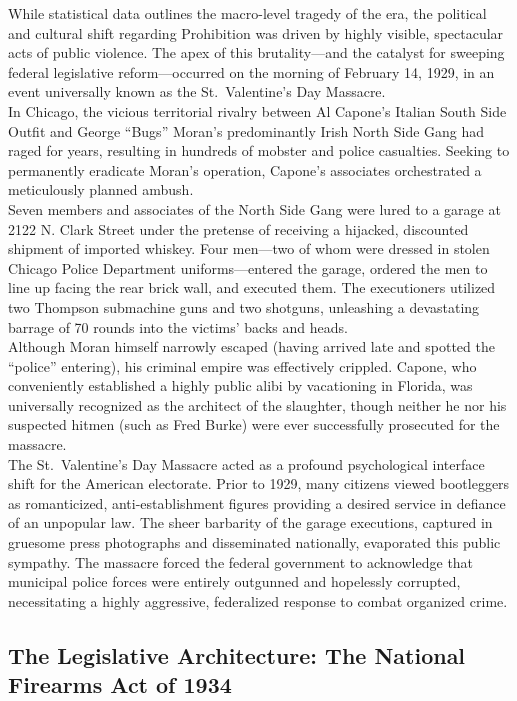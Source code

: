 \documentclass[
]{article}
\begin{document}
While statistical data outlines the macro-level tragedy of the era, the
political and cultural shift regarding Prohibition was driven by highly
visible, spectacular acts of public violence. The apex of this
brutality---and the catalyst for sweeping federal legislative
reform---occurred on the morning of February 14, 1929, in an event
universally known as the St.~Valentine's Day Massacre.\\
In Chicago, the vicious territorial rivalry between Al Capone's Italian
South Side Outfit and George ``Bugs'' Moran's predominantly Irish North
Side Gang had raged for years, resulting in hundreds of mobster and
police casualties. Seeking to permanently eradicate Moran's operation,
Capone's associates orchestrated a meticulously planned ambush.\\
Seven members and associates of the North Side Gang were lured to a
garage at 2122 N. Clark Street under the pretense of receiving a
hijacked, discounted shipment of imported whiskey. Four men---two of
whom were dressed in stolen Chicago Police Department uniforms---entered
the garage, ordered the men to line up facing the rear brick wall, and
executed them. The executioners utilized two Thompson submachine guns
and two shotguns, unleashing a devastating barrage of 70 rounds into the
victims' backs and heads.\\
Although Moran himself narrowly escaped (having arrived late and spotted
the ``police'' entering), his criminal empire was effectively crippled.
Capone, who conveniently established a highly public alibi by
vacationing in Florida, was universally recognized as the architect of
the slaughter, though neither he nor his suspected hitmen (such as Fred
Burke) were ever successfully prosecuted for the massacre.\\
The St.~Valentine's Day Massacre acted as a profound psychological
interface shift for the American electorate. Prior to 1929, many
citizens viewed bootleggers as romanticized, anti-establishment figures
providing a desired service in defiance of an unpopular law. The sheer
barbarity of the garage executions, captured in gruesome press
photographs and disseminated nationally, evaporated this public
sympathy. The massacre forced the federal government to acknowledge that
municipal police forces were entirely outgunned and hopelessly
corrupted, necessitating a highly aggressive, federalized response to
combat organized crime.

\subsection{\texorpdfstring{\textbf{The Legislative Architecture: The
National Firearms Act of
1934}}{The Legislative Architecture: The National Firearms Act of 1934}}\label{the-legislative-architecture-the-national-firearms-act-of-1934}
\end{document}
